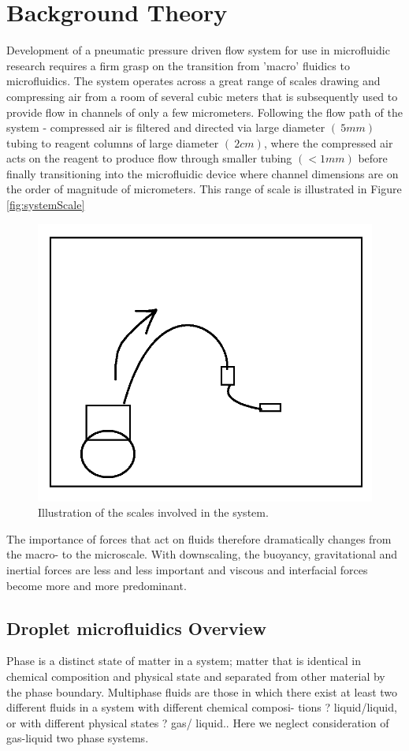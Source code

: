 \chapter{Background Theory}

Development of a pneumatic pressure driven flow system for use in microfluidic research requires a firm grasp on the transition from 'macro' fluidics to microfluidics. The system operates across a great range of scales drawing and compressing air from a room of several cubic meters that is subsequently used to provide flow in channels of only a few micrometers. Following the flow path of the system - compressed air is filtered and directed via large diameter $(~5mm)$ tubing to reagent columns of large diameter $(~2cm)$, where the compressed air acts on the reagent to produce flow through smaller tubing $(<1mm)$ before finally transitioning into the microfluidic device where channel dimensions are on the order of magnitude of micrometers. This range of scale is illustrated in Figure \vref{fig:systemScale}

\begin{figure}[h]
\centering 
\includegraphics[width=0.60\columnwidth]{systemScale.PNG} 
\caption[System Scales]{Illustration of the scales involved in the system.} %
\label{fig:systemScale} 
\end{figure}

\clearpage

The importance of forces that act on fluids therefore dramatically changes from the macro- to the microscale. With downscaling, the buoyancy, gravitational and inertial forces are less and less important and viscous and interfacial forces become more and more predominant.\cite{Shui2007}


\section{Droplet microfluidics Overview}
Phase is a distinct state of matter in a system; matter that is identical in chemical composition and physical state and separated from other material by the phase boundary. Multiphase fluids are those in which there exist at least two different fluids in a system with different chemical composi- tions ? liquid/liquid, or with different physical states ? gas/ liquid.\cite{Shui2007}. Here we neglect consideration of gas-liquid two phase systems. 


